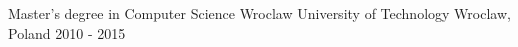 

\begin{cventries}

  \cventry
    {Master's degree in Computer Science} %
    {Wroclaw University of Technology} %
    {Wroclaw, Poland} %
    {2010 - 2015} %
    {}

\end{cventries}
